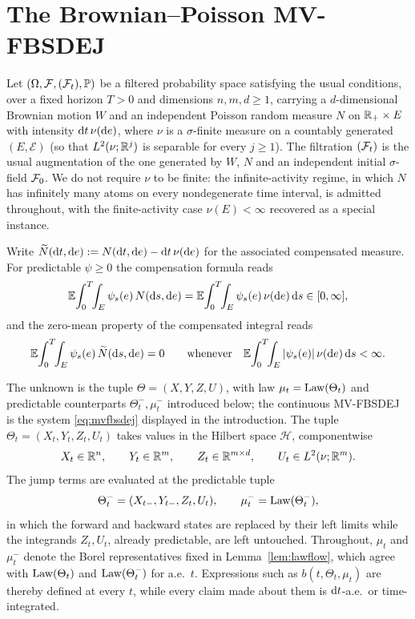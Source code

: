 \section{The Brownian--Poisson MV-FBSDEJ}\label{sec:main-assumptions}
Let $(\Omega,\mathcal{F},(\mathcal{F}_t),\mathbb{P})$ be a filtered probability space satisfying the usual
conditions, over a fixed horizon $T>0$ and dimensions $n,m,d\ge1$, carrying a
$d$-dimensional Brownian motion $W$ and an independent Poisson random measure $N$ on
$\mathbb{R}_+\times E$ with intensity $\mathrm{d} t\,\nu(\mathrm{d} e)$, where $\nu$ is a
$\sigma$-finite measure on a countably generated $(E,\mathcal E)$ (so that
$L^2(\nu;\mathbb{R}^j)$ is separable for every $j\ge1$). The filtration $(\mathcal{F}_t)$ is the usual augmentation of the one generated by $W$,
$N$ and an independent initial $\sigma$-field $\mathcal{F}_0$.
We do not require $\nu$ to be finite: the infinite-activity regime,
in which $N$ has infinitely many atoms on every nondegenerate time interval, is admitted
throughout, with the finite-activity case $\nu(E)<\infty$ recovered as a special instance.

Write $\widetilde{N}(\mathrm{d} t,\mathrm{d} e):=N(\mathrm{d} t,\mathrm{d} e)-\mathrm{d} t\,\nu(\mathrm{d} e)$ for the
associated compensated measure. For predictable $\psi\ge0$ the compensation formula
reads
\begin{equation}\label{eq:compid}
\mathbb{E}\!\int_0^T\!\!\int_E\psi_s(e)\,N(\mathrm{d} s,\mathrm{d} e)
=\mathbb{E}\!\int_0^T\!\!\int_E\psi_s(e)\,\nu(\mathrm{d} e)\,\mathrm{d} s\in[0,\infty],
\end{equation}
and the zero-mean property of the compensated integral reads
\begin{equation}\label{eq:zeromean}
\mathbb{E}\!\int_0^T\!\!\int_E\psi_s(e)\,\widetilde{N}(\mathrm{d} s,\mathrm{d} e)=0
\qquad\text{whenever}\quad
\mathbb{E}\!\int_0^T\!\!\int_E|\psi_s(e)|\,\nu(\mathrm{d} e)\,\mathrm{d} s<\infty .
\end{equation}

The unknown is the tuple $\Theta=(X,Y,Z,U)$, with law $\mu_t=\mathrm{Law}(\Theta_t)$ and predictable
counterparts $\Theta_t^-,\mu_t^-$ introduced below; the continuous MV-FBSDEJ is the system
\eqref{eq:mvfbsdej} displayed in the introduction. The tuple
$\Theta_t=(X_t,Y_t,Z_t,U_t)$ takes values in the Hilbert space $\mathcal H$,
componentwise
\[
X_t\in\mathbb{R}^n,\qquad Y_t\in\mathbb{R}^m,\qquad Z_t\in\mathbb{R}^{m\times d},\qquad U_t\in L^2(\nu;\mathbb{R}^m).
\]
The jump terms are evaluated at the predictable tuple
\[
\Theta_t^-=(X_{t-},Y_{t-},Z_t,U_t),\qquad \mu_t^-=\mathrm{Law}(\Theta_t^-),
\]
in which the forward and backward states are replaced by their left limits while the
integrands $Z_t,U_t$, already predictable, are left untouched.
Throughout, $\mu_t$ and $\mu_t^-$ denote the Borel
representatives fixed in Lemma~\ref{lem:lawflow}, which agree with $\mathrm{Law}(\Theta_t)$ and
$\mathrm{Law}(\Theta_t^-)$ for a.e.\ $t$. Expressions such as $b(t,\Theta_t,\mu_t)$ are thereby
defined at every $t$, while every claim made about them is $\mathrm{d} t$-a.e.\ or
time-integrated.

